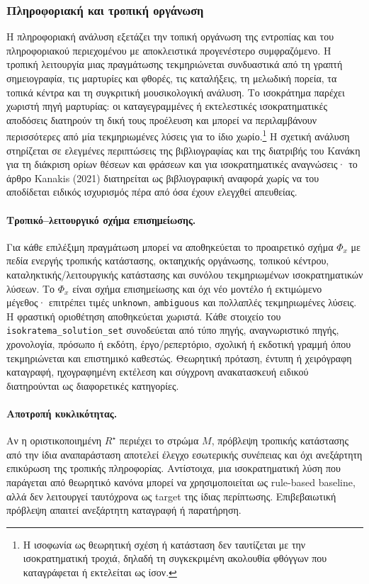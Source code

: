 \documentclass[11pt,a4paper]{article}
\begin{document}
\subsubsection{Πληροφοριακή και τροπική οργάνωση}
Η πληροφοριακή ανάλυση εξετάζει την τοπική οργάνωση της εντροπίας και του πληροφοριακού περιεχομένου με αποκλειστικά προγενέστερο συμφραζόμενο. Η τροπική λειτουργία μιας πραγμάτωσης τεκμηριώνεται συνδυαστικά από τη γραπτή σημειογραφία, τις μαρτυρίες και φθορές, τις καταλήξεις, τη μελωδική πορεία, τα τοπικά κέντρα και τη συγκριτική μουσικολογική ανάλυση. Το ισοκράτημα παρέχει χωριστή πηγή μαρτυρίας: οι καταγεγραμμένες ή εκτελεστικές ισοκρατηματικές αποδόσεις διατηρούν τη δική τους προέλευση και μπορεί να περιλαμβάνουν περισσότερες από μία τεκμηριωμένες λύσεις για το ίδιο χωρίο.\footnote{Η ισοφωνία ως θεωρητική σχέση ή κατάσταση δεν ταυτίζεται με την ισοκρατηματική τροχιά, δηλαδή τη συγκεκριμένη ακολουθία φθόγγων που καταγράφεται ή εκτελείται ως ίσον.} Η σχετική ανάλυση στηρίζεται σε ελεγμένες περιπτώσεις της βιβλιογραφίας και της διατριβής του Κανάκη για τη διάκριση ορίων θέσεων και φράσεων και για ισοκρατηματικές αναγνώσεις· το άρθρο Kanakis (2021) διατηρείται ως βιβλιογραφική αναφορά χωρίς να του αποδίδεται ειδικός ισχυρισμός πέρα από όσα έχουν ελεγχθεί απευθείας.

\paragraph{Τροπικό--λειτουργικό σχήμα επισημείωσης.} Για κάθε επιλέξιμη πραγμάτωση μπορεί να αποθηκεύεται το προαιρετικό σχήμα $\Phi_x$ με πεδία ενεργής τροπικής κατάστασης, οκταηχικής οργάνωσης, τοπικού κέντρου, καταληκτικής/λειτουργικής κατάστασης και συνόλου τεκμηριωμένων ισοκρατηματικών λύσεων. Το $\Phi_x$ είναι σχήμα επισημείωσης και όχι νέο μοντέλο ή εκτιμώμενο μέγεθος· επιτρέπει τιμές \texttt{unknown}, \texttt{ambiguous} και πολλαπλές τεκμηριωμένες λύσεις. Η φραστική οριοθέτηση αποθηκεύεται χωριστά. Κάθε στοιχείο του \texttt{isokratema\_solution\_set} συνοδεύεται από τύπο πηγής, αναγνωριστικό πηγής, χρονολογία, πρόσωπο ή εκδότη, έργο/ρεπερτόριο, σχολική ή εκδοτική γραμμή όπου τεκμηριώνεται και επιστημικό καθεστώς. Θεωρητική πρόταση, έντυπη ή χειρόγραφη καταγραφή, ηχογραφημένη εκτέλεση και σύγχρονη ανακατασκευή ειδικού διατηρούνται ως διαφορετικές κατηγορίες.

\paragraph{Αποτροπή κυκλικότητας.} Αν η οριστικοποιημένη $R^\star$ περιέχει το στρώμα $M$, πρόβλεψη τροπικής κατάστασης από την ίδια αναπαράσταση αποτελεί έλεγχο εσωτερικής συνέπειας και όχι ανεξάρτητη επικύρωση της τροπικής πληροφορίας. Αντίστοιχα, μια ισοκρατηματική λύση που παράγεται από θεωρητικό κανόνα μπορεί να χρησιμοποιείται ως rule-based baseline, αλλά δεν λειτουργεί ταυτόχρονα ως target της ίδιας περίπτωσης. Επιβεβαιωτική πρόβλεψη απαιτεί ανεξάρτητη καταγραφή ή παρατήρηση.
\end{document}

